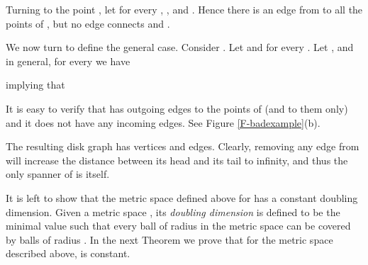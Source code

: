 \documentclass[proceedings]{stacs}
\theoremstyle{plain}\newtheorem{satz}[thm]{Satz}
\theoremstyle{definition}\newtheorem{crucial}[thm]{Crucial Definition}
\begin{document}
Turning to the point , let  for every
, , and . Hence
there is an edge from  to all the points of , but no edge
connects  and .

We now turn to define the general case. Consider . Let
 and  for every . Let , and in general, for
every  we have

implying that

It is easy to verify that  has outgoing edges to the points
of  (and to them only) and it does not have any incoming edges.
See Figure \ref{F-badexample}(b).

The resulting disk graph  has  vertices and 
edges. Clearly, removing any edge from  will increase the
distance between its head and its tail to infinity, and thus the
only spanner of  is  itself.

It is left to show that the metric space defined above for  has
a constant doubling dimension. Given a metric space ,
its {\em doubling dimension} is defined to be the minimal value
 such that every ball  of radius  in the metric space can
be covered by  balls of radius . In the next Theorem
we prove that for the metric space described above,  is
constant.
\end{document}

